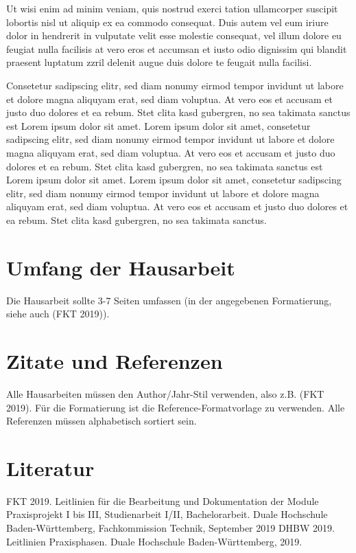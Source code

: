 Ut wisi enim ad minim veniam, quis nostrud exerci tation ullamcorper suscipit lobortis nisl ut aliquip ex ea commodo consequat. Duis autem vel eum iriure dolor in hendrerit in vulputate velit esse molestie consequat, vel illum dolore eu feugiat nulla facilisis at vero eros et accumsan et iusto odio dignissim qui blandit praesent luptatum zzril delenit augue duis dolore te feugait nulla facilisi.   


Consetetur sadipscing elitr, sed diam nonumy eirmod tempor invidunt ut labore et dolore magna aliquyam erat, sed diam voluptua. At vero eos et accusam et justo duo dolores et ea rebum. Stet clita kasd gubergren, no sea takimata sanctus est Lorem ipsum dolor sit amet. Lorem ipsum dolor sit amet, consetetur sadipscing elitr, sed diam nonumy eirmod tempor invidunt ut labore et dolore magna aliquyam erat, sed diam voluptua. At vero eos et accusam et justo duo dolores et ea rebum. Stet clita kasd gubergren, no sea takimata sanctus est Lorem ipsum dolor sit amet. Lorem ipsum dolor sit amet, consetetur sadipscing elitr, sed diam nonumy eirmod tempor invidunt ut labore et dolore magna aliquyam erat, sed diam voluptua. At vero eos et accusam et justo duo dolores et ea rebum. Stet clita kasd gubergren, no sea takimata sanctus.  

\section{Umfang der Hausarbeit}
Die Hausarbeit sollte 3-7 Seiten umfassen (in der angegebenen Formatierung, siehe auch (FKT 2019)).
\section{Zitate und Referenzen}
Alle Hausarbeiten müssen den Author/Jahr-Stil verwenden, also z.B. (FKT 2019).
Für die Formatierung ist die Reference-Formatvorlage zu verwenden. Alle Referenzen müssen alphabetisch sortiert sein.
\section{Literatur}
FKT  2019. Leitlinien für die Bearbeitung und Dokumentation der Module Praxisprojekt I bis III, Studienarbeit I/II, Bachelorarbeit. Duale Hochschule Baden-Württemberg, Fachkommission Technik, September 2019
DHBW  2019. Leitlinien Praxisphasen. Duale Hochschule Baden-Württemberg, 2019.


